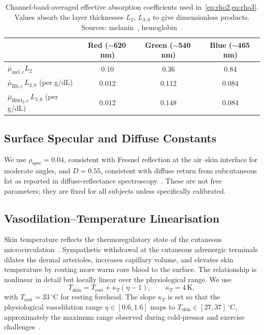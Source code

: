 \documentclass[10pt,twocolumn,a4paper]{article}
\theoremstyle{definition}
\newcommand{\Hb}{\mathrm{Hb}}
\newcommand{\HbO}{\mathrm{HbO_2}}
\newcommand{\Tskin}{T_{\mathrm{skin}}}
\newcommand{\vaso}{\eta}
\begin{document}
\begin{table}[H]
\centering
\caption{Channel-band-averaged effective absorption coefficients used
in~\cref{eq:rho2,eq:rho3}. Values absorb the layer thicknesses
$L_{2}$, $L_{3,0}$ to give dimensionless products. Sources:
melanin~\cite{jacques1998melanin}, hemoglobin~\cite{prahlomlc}.}
\label{tab:abs-coeffs}
\small
\begin{tabular}{lccc}
\toprule
& Red ($\sim$620\,nm) & Green ($\sim$540\,nm) & Blue ($\sim$465\,nm) \\
\midrule
$\bar{\mu}_{\mathrm{mel},c} L_{2}$ & 0.10 & 0.36 & 0.84 \\
$\bar{\mu}_{\Hb,c}\, L_{3,0}$ (per g/dL) & 0.012 & 0.112 & 0.084 \\
$\bar{\mu}_{\HbO,c}\, L_{3,0}$ (per g/dL) & 0.012 & 0.148 & 0.084 \\
\bottomrule
\end{tabular}
\end{table}

\subsection{Surface Specular and Diffuse Constants}

We use $\rho_{\mathrm{spec}}=0.04$, consistent with Fresnel reflection
at the air--skin interface for moderate angles, and $D=0.55$,
consistent with diffuse return from subcutaneous fat as reported in
diffuse-reflectance spectroscopy~\cite{tuchin2007,bosschaart2014}.
These are not free parameters; they are fixed for all subjects unless
specifically calibrated.

\subsection{Vasodilation--Temperature Linearisation}

Skin temperature reflects the thermoregulatory state of the
cutaneous microcirculation~\cite{rowell1977,charkoudian2010}. Sympathetic
withdrawal at the cutaneous adrenergic terminals dilates the dermal
arterioles, increases capillary volume, and elevates skin temperature
by routing more warm core blood to the surface. The relationship is
nonlinear in detail but locally linear over the physiological range.
We use
\begin{equation}
    \Tskin = T_{\mathrm{rest}} + \kappa_{T}(\vaso - 1),
    \qquad \kappa_{T} = 4\,\mathrm{K},
    \label{eq:vaso-T}
\end{equation}
with $T_{\mathrm{rest}}=33\,^{\circ}\mathrm{C}$ for resting forehead.
The slope $\kappa_{T}$ is set so that the physiological vasodilation
range $\vaso\in[0.6,1.6]$ maps to
$\Tskin\in[27,37]\,^{\circ}\mathrm{C}$, approximately the
maximum range observed during cold-pressor and exercise
challenges~\cite{webb1992,charkoudian2010}.
\end{document}
